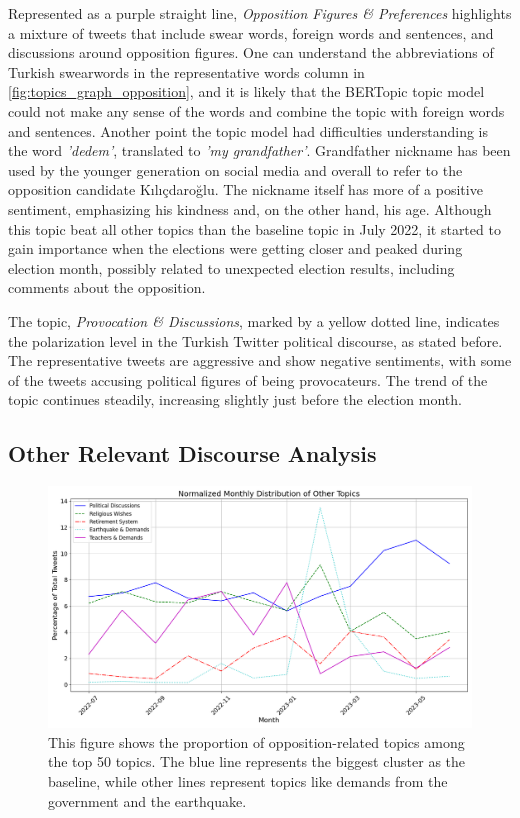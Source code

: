 Represented as a purple straight line, \textit{Opposition Figures \& Preferences} highlights a mixture of 
tweets that include swear words, foreign words and sentences, and discussions around opposition figures.
One can understand the abbreviations of Turkish swearwords in the representative words column in 
\autoref{fig:topics_graph_opposition}, and it is likely that the BERTopic topic model could not make any 
sense of the words and combine the topic with foreign words and sentences. 
Another point the topic model had difficulties understanding is the word \textit{'dedem'}, 
translated to \textit{'my grandfather'}. Grandfather nickname has been used by the younger generation on 
social media and overall to refer to the opposition candidate Kılıçdaroğlu. The nickname itself has more of a 
positive sentiment, emphasizing his kindness and, on the other hand, his age. 
Although this topic beat all other topics than the baseline topic in July 2022, it started to gain importance 
when the elections were getting closer and peaked during election month, possibly related to unexpected 
election results, including comments about the opposition.

The topic, \textit{Provocation \& Discussions}, marked by a yellow dotted line, indicates the polarization 
level in the Turkish Twitter political discourse, as stated before. The representative tweets are aggressive 
and show negative sentiments, with some of the tweets accusing political figures of being provocateurs. 
The trend of the topic continues steadily, increasing slightly just before the election month.

\subsection{Other Relevant Discourse Analysis}

\begin{figure}[htb]
    \centering
    \includegraphics[width=\linewidth]{figures/normalized_other_selected_topics_distribution_with_styles.png}
    \caption[Normalized Monthly Distribution of Other Topics]
    {This figure shows the proportion of opposition-related topics among the top 50 topics. 
    The blue line represents the biggest cluster as the baseline, while other lines represent topics 
    like demands from the government and the earthquake.}\label{fig:topics_graph_other}
\end{figure}

